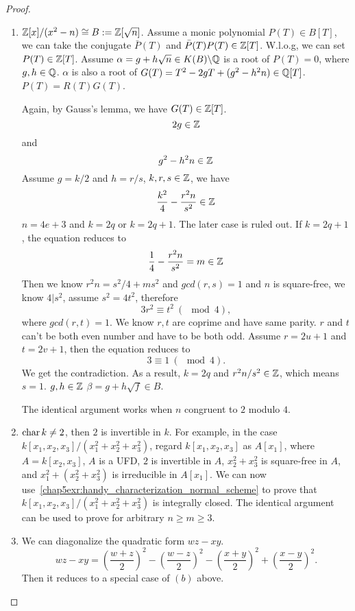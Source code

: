 \begin{proof}
\begin{enumerate}[label=(\alph*)]
\item $\mathbb Z[x]/(x^2-n)\cong B:=\mathbb Z[\sqrt{n}]$. Assume a monic polynomial $P(T)\in B[T]$, we can take the conjugate $\bar{P}(T)$ and $\bar{P}(T)P(T)\in \mathbb Z[T]$. W.l.o.g, we can set $P(T)\in \mathbb Z[T]$. Assume $\alpha=g+h\sqrt{n}\in K(B)\backslash \mathbb Q$ is a root of $P(T)=0$, where $g,h\in \mathbb Q$. $\alpha$ is also a root of $G(T)= T^2 - 2gT + (g^2 - h^2n) \in \mathbb Q[T]$. $P(T)=R(T)G(T)$.

Again, by Gauss's lemma, we have $G(T)\in \mathbb Z[T]$.
$$
2g\in \mathbb Z
$$
and
$$
g^2-h^2n\in \mathbb Z
$$
Assume $g=k/2$ and $h=r/s$, $k,r,s\in\mathbb Z$, we have
$$
\frac{k^2}{4}-\frac{r^2n}{s^2}\in \mathbb Z
$$
$n=4e+3$ and $k=2q$ or $k=2q+1$. The later case is ruled out. If $k=2q+1$,  the equation reduces to
$$
\frac{1}{4}-\frac{r^2n}{s^2}=m\in \mathbb Z
$$
Then we know $r^2 n=s^2/4 +ms^2$ and
$gcd(r,s)=1$ and $n$ is square-free, we know $4|s^2$, assume $s^2=4t^2$, therefore
$$
3r^2\equiv t^2\ (\mod 4), 
$$
where $gcd(r,t)=1$. We know $r,t$ are coprime and have same parity. $r$ and $t$ can't be both even number and have to be both odd. Assume $r=2u+1$ and $t=2v+1$, then the equation reduces to
$$
3\equiv 1\ (\mod 4).
$$
We get the contradiction. As a result, $k=2q$ and $r^2n/s^2\in\mathbb Z$, which means $s=1$. $g,h\in \mathbb Z$ $\beta=g+h\sqrt{f}\in B$.

The identical argument works when $n$ congruent to $2$ modulo $4$.

\item $\text{char\,} k\neq 2$, then $2$ is invertible in $k$. For example, in the case
$k[x_1,x_2,x_3]/(x_1^2+x_2^2+x_3^2)$, regard $k[x_1,x_2,x_3]$ as $A[x_1]$, where $A=k[x_2,x_3]$, $A$ is a UFD, $2$ is invertible in $A$, $x_2^2+x_3^2$ is square-free in $A$, and $x_1^2+(x_2^2+x_3^2)$ is irreducible in $A[x_1]$. We can now use~\ref{chap5exr:handy_characterization_normal_scheme} to prove that $k[x_1,x_2,x_3]/(x_1^2+x_2^2+x_3^2)$ is integrally closed. The identical argument can be used to prove for arbitrary $n\geq m\geq 3$.
\item We can diagonalize the quadratic form $wz-xy$.
$$
wz-xy=\left(\frac{w+z}{2}\right)^2-\left(\frac{w-z}{2}\right)^2-\left(\frac{x+y}{2}\right)^2+\left(\frac{x-y}{2}\right)^2.
$$
Then it reduces to a special case of $(b)$ above.

\end{enumerate}
\end{proof}
